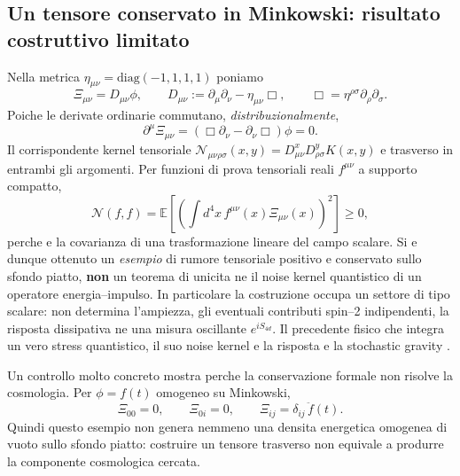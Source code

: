 \documentclass[11pt,a4paper]{article}
\begin{document}
\subsection{Un tensore conservato in Minkowski: risultato costruttivo limitato}

Nella metrica $\eta_{\mu\nu}=\mathrm{diag}(-1,1,1,1)$ poniamo
\begin{equation}
 \Xi_{\mu\nu}=D_{\mu\nu}\phi,
 \qquad D_{\mu\nu}:=\partial_\mu\partial_\nu-\eta_{\mu\nu}\Box,
 \qquad\Box=\eta^{\rho\sigma}\partial_\rho\partial_\sigma.
 \label{eq:r12ai_flat_projector}
\end{equation}
Poiche le derivate ordinarie commutano, \emph{distribuzionalmente},
\begin{equation}
 \boxed{\partial^\mu\Xi_{\mu\nu}=(\Box\partial_\nu-\partial_\nu\Box)\phi=0.}
 \label{eq:r12ai_flat_ward}
\end{equation}
Il corrispondente kernel tensoriale $\mathcal N_{\mu\nu\rho\sigma}(x,y)
 =D^x_{\mu\nu}D^y_{\rho\sigma}K(x,y)$ e trasverso in entrambi gli argomenti. Per funzioni di prova tensoriali reali $f^{\mu\nu}$ a supporto compatto,
\begin{equation}
 \mathcal N(f,f)=\mathbb E\!\left[\left(\int d^4x\,f^{\mu\nu}(x)\Xi_{\mu\nu}(x)\right)^2\right]\ge0,
 \label{eq:r12ai_tensor_psd}
\end{equation}
perche e la covarianza di una trasformazione lineare del campo scalare. Si e dunque ottenuto un \emph{esempio} di rumore tensoriale positivo e conservato sullo sfondo piatto, \textbf{non} un teorema di unicita ne il noise kernel quantistico di un operatore energia--impulso. In particolare la costruzione occupa un settore di tipo scalare: non determina l'ampiezza, gli eventuali contributi spin--2 indipendenti, la risposta dissipativa ne una misura oscillante $e^{iS_{4d}}$. Il precedente fisico che integra un vero stress quantistico, il suo noise kernel e la risposta e la stochastic gravity \cite{HuVerdaguer2008}.

Un controllo molto concreto mostra perche la conservazione formale non risolve la cosmologia. Per $\phi=f(t)$ omogeneo su Minkowski,
\begin{equation}
 \Xi_{00}=0,\qquad \Xi_{0i}=0,\qquad\Xi_{ij}=\delta_{ij}\,\ddot f(t).
 \label{eq:r12ai_hom_flat}
\end{equation}
Quindi questo esempio non genera nemmeno una densita energetica omogenea di vuoto sullo sfondo piatto: costruire un tensore trasverso non equivale a produrre la componente cosmologica cercata.
\end{document}
